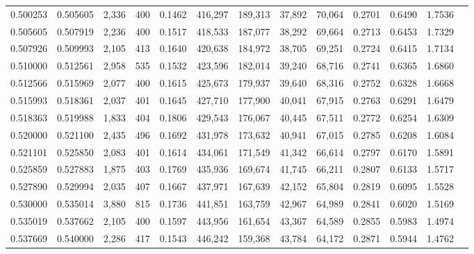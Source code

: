\begin{tabular}{rrrrrrrrrrrrr}
0.500253 & 0.505605 &  2,336 &   400 &                                     0.1462 & 416,297 & 189,313 &  37,892 &  70,064 & 0.2701 & 0.6490 & 1.7536 \\
0.505605 & 0.507919 &  2,236 &   400 &                                     0.1517 & 418,533 & 187,077 &  38,292 &  69,664 & 0.2713 & 0.6453 & 1.7329 \\
0.507926 & 0.509993 &  2,105 &   413 &                                     0.1640 & 420,638 & 184,972 &  38,705 &  69,251 & 0.2724 & 0.6415 & 1.7134 \\
0.510000 & 0.512561 &  2,958 &   535 &                                     0.1532 & 423,596 & 182,014 &  39,240 &  68,716 & 0.2741 & 0.6365 & 1.6860 \\
0.512566 & 0.515969 &  2,077 &   400 &                                     0.1615 & 425,673 & 179,937 &  39,640 &  68,316 & 0.2752 & 0.6328 & 1.6668 \\
0.515993 & 0.518361 &  2,037 &   401 &                                     0.1645 & 427,710 & 177,900 &  40,041 &  67,915 & 0.2763 & 0.6291 & 1.6479 \\
0.518363 & 0.519988 &  1,833 &   404 &                                     0.1806 & 429,543 & 176,067 &  40,445 &  67,511 & 0.2772 & 0.6254 & 1.6309 \\
0.520000 & 0.521100 &  2,435 &   496 &                                     0.1692 & 431,978 & 173,632 &  40,941 &  67,015 & 0.2785 & 0.6208 & 1.6084 \\
0.521101 & 0.525850 &  2,083 &   401 &                                     0.1614 & 434,061 & 171,549 &  41,342 &  66,614 & 0.2797 & 0.6170 & 1.5891 \\
0.525859 & 0.527883 &  1,875 &   403 &                                     0.1769 & 435,936 & 169,674 &  41,745 &  66,211 & 0.2807 & 0.6133 & 1.5717 \\
0.527890 & 0.529994 &  2,035 &   407 &                                     0.1667 & 437,971 & 167,639 &  42,152 &  65,804 & 0.2819 & 0.6095 & 1.5528 \\
0.530000 & 0.535014 &  3,880 &   815 &                                     0.1736 & 441,851 & 163,759 &  42,967 &  64,989 & 0.2841 & 0.6020 & 1.5169 \\
0.535019 & 0.537662 &  2,105 &   400 &                                     0.1597 & 443,956 & 161,654 &  43,367 &  64,589 & 0.2855 & 0.5983 & 1.4974 \\
0.537669 & 0.540000 &  2,286 &   417 &                                     0.1543 & 446,242 & 159,368 &  43,784 &  64,172 & 0.2871 & 0.5944 & 1.4762 \\

\end{tabular}
